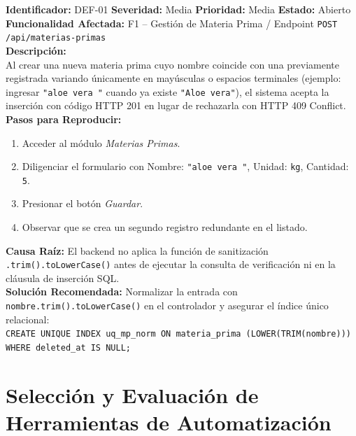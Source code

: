 \documentclass[11pt,a4paper]{article}
\begin{document}
\begin{tcolorbox}[colback=lightgray,colframe=accentred,title=\textbf{Ficha de Defecto: DEF-01 (F1-CP-03 -- Violación de RN-01)}]
\small
\textbf{Identificador:} DEF-01 \quad \textbf{Severidad:} Media \quad \textbf{Prioridad:} Media \quad \textbf{Estado:} Abierto\\
\textbf{Funcionalidad Afectada:} F1 -- Gestión de Materia Prima / Endpoint \texttt{POST /api/materias-primas}\\[2mm]
\textbf{Descripción:}\\
Al crear una nueva materia prima cuyo nombre coincide con una previamente registrada variando únicamente en mayúsculas o espacios terminales (ejemplo: ingresar \texttt{"aloe vera "} cuando ya existe \texttt{"Aloe vera"}), el sistema acepta la inserción con código HTTP 201 en lugar de rechazarla con HTTP 409 Conflict.\\[2mm]
\textbf{Pasos para Reproducir:}
\begin{enumerate}[noitemsep]
    \item Acceder al módulo \textit{Materias Primas}.
    \item Diligenciar el formulario con Nombre: \texttt{"aloe vera "}, Unidad: \texttt{kg}, Cantidad: \texttt{5}.
    \item Presionar el botón \textit{Guardar}.
    \item Observar que se crea un segundo registro redundante en el listado.
\end{enumerate}
\textbf{Causa Raíz:} El backend no aplica la función de sanitización \texttt{.trim().toLowerCase()} antes de ejecutar la consulta de verificación ni en la cláusula de inserción SQL.\\
\textbf{Solución Recomendada:} Normalizar la entrada con \texttt{nombre.trim().toLowerCase()} en el controlador y asegurar el índice único relacional:\\
\texttt{CREATE UNIQUE INDEX uq\_mp\_norm ON materia\_prima (LOWER(TRIM(nombre))) WHERE deleted\_at IS NULL;}
\end{tcolorbox}

\section{Selección y Evaluación de Herramientas de Automatización}
\end{document}
